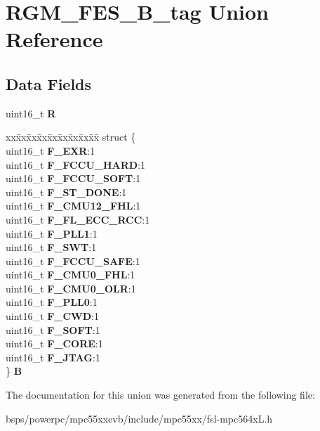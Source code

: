 \hypertarget{unionRGM__FES__16B__tag}{}\section{R\+G\+M\+\_\+\+F\+E\+S\+\_\+B\+\_\+tag Union Reference}
\label{unionRGM__FES__16B__tag}
\subsection*{Data Fields}
\begin{DoxyCompactItemize}
\item 
\mbox{\label{unionRGM__FES__16B__tag_a31777379bd321ca4ec8ac9d6fbe33173}} 
uint16\+\_\+t {\bfseries R}
\item 
\mbox{\label{unionRGM__FES__16B__tag_a0ae4d39698061361dfd2c6d8158687be}} 
\begin{tabbing}
xx\=xx\=xx\=xx\=xx\=xx\=xx\=xx\=xx\=\kill
struct \{\\
\>uint16\_t {\bfseries F\_EXR}:1\\
\>uint16\_t {\bfseries F\_FCCU\_HARD}:1\\
\>uint16\_t {\bfseries F\_FCCU\_SOFT}:1\\
\>uint16\_t {\bfseries F\_ST\_DONE}:1\\
\>uint16\_t {\bfseries F\_CMU12\_FHL}:1\\
\>uint16\_t {\bfseries F\_FL\_ECC\_RCC}:1\\
\>uint16\_t {\bfseries F\_PLL1}:1\\
\>uint16\_t {\bfseries F\_SWT}:1\\
\>uint16\_t {\bfseries F\_FCCU\_SAFE}:1\\
\>uint16\_t {\bfseries F\_CMU0\_FHL}:1\\
\>uint16\_t {\bfseries F\_CMU0\_OLR}:1\\
\>uint16\_t {\bfseries F\_PLL0}:1\\
\>uint16\_t {\bfseries F\_CWD}:1\\
\>uint16\_t {\bfseries F\_SOFT}:1\\
\>uint16\_t {\bfseries F\_CORE}:1\\
\>uint16\_t {\bfseries F\_JTAG}:1\\
\} {\bfseries B}\\

\end{tabbing}\end{DoxyCompactItemize}


The documentation for this union was generated from the following file\+:\begin{DoxyCompactItemize}
\item 
bsps/powerpc/mpc55xxevb/include/mpc55xx/fsl-\/mpc564x\+L.\+h\end{DoxyCompactItemize}
